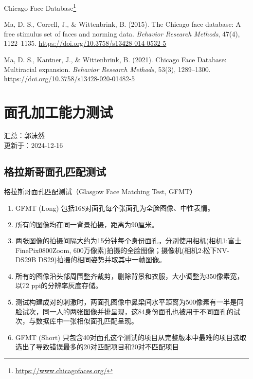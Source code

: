 \documentclass[]{ctexbook}
\providecommand{\tightlist}{%
  \setlength{\itemsep}{0pt}\setlength{\parskip}{0pt}}
\renewcommand{\href}[2]{#2\footnote{\url{#1}}}
\theoremstyle{definition}
\theoremstyle{definition}
\theoremstyle{definition}
\theoremstyle{definition}
\theoremstyle{remark}
\begin{document}
\href{https://www.chicagofaces.org/}{Chicago Face Database}

Ma, D. S., Correll, J., \& Wittenbrink, B. (2015). The Chicago face database: A free stimulus set of faces and norming data. \emph{Behavior Research Methods}, 47(4), 1122--1135. \url{https://doi.org/10.3758/s13428-014-0532-5}

Ma, D. S., Kantner, J., \& Wittenbrink, B. (2021). Chicago Face Database: Multiracial expansion. \emph{Behavior Research Methods}, 53(3), 1289--1300. \url{https://doi.org/10.3758/s13428-020-01482-5}

\chapter{面孔加工能力测试}\label{facetest}

汇总：郭沫然\\
更新于：2024-12-16

\section{格拉斯哥面孔匹配测试}\label{ux683cux62c9ux65afux54e5ux9762ux5b54ux5339ux914dux6d4bux8bd5}

格拉斯哥面孔匹配测试（Glasgow Face Matching Test, GFMT）

\begin{enumerate}
\def\labelenumi{\arabic{enumi}.}
\tightlist
\item
  GFMT (Long) 包括168对面孔每个张面孔为全脸图像、中性表情。
\item
  所有的图像均在同一背景拍摄，距离为90厘米。\\
\item
  两张图像的拍摄间隔大约为15分钟每个身份面孔，分别使用相机(相机1:富士FinePix0800Zoom, 600万像素)拍摄的全脸图像；摄像机(相机2:松下NV-DS29B DS29)拍摄的相同姿势并取其中一帧图像。\\
\item
  所有的图像沿头部周围整齐裁剪，删除背景和衣服，大小调整为350像素宽，以72 ppi的分辨率灰度存储。\\
\item
  测试构建成对的刺激时，两面孔图像中鼻梁间水平距离为500像素有一半是同脸试次，同一人的两张图像并排呈现，这84身份面孔也被用于不同面孔的试次，与数据库中一张相似面孔匹配呈现。\\
\item
  GFMT (Short) 只包含40对面孔这个测试的项目从完整版本中最难的项目选取选出了导致错误最多的20对匹配项目和20对不匹配项目
\end{enumerate}
\end{document}
